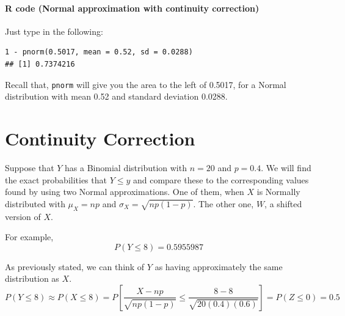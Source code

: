 \paragraph*{R code (Normal approximation with continuity correction)}

Just type in the following:

\begin{verbatim}
1 - pnorm(0.5017, mean = 0.52, sd = 0.0288)
## [1] 0.7374216
\end{verbatim}

Recall that, \texttt{pnorm} will give you the area to the left of 0.5017, for a Normal distribution with mean 0.52 and standard deviation 0.0288.

\section{Continuity Correction}

Suppose that $Y$ has a Binomial distribution with $n = 20$ and $p = 0.4$. We will find the exact probabilities that $Y \leq y$ and compare these to the corresponding values found by using two Normal approximations. One of them, when $X$ is Normally distributed with $\mu_X = np$ and $\sigma_X = \sqrt{np(1 - p)}$.
\vspace{1em}
The other one, $W$, a shifted version of $X$.

\vspace{1em}

For example,
\[
P(Y \leq 8) = 0.5955987
\]

As previously stated, we can think of $Y$ as having approximately the same distribution as $X$.
\[
P(Y \leq 8) \approx P(X \leq 8)
= P\left[ \frac{X - np}{\sqrt{np(1 - p)}} \leq \frac{8 - 8}{\sqrt{20(0.4)(0.6)}} \right]
= P(Z \leq 0) = 0.5
\]

\vspace{1em}

